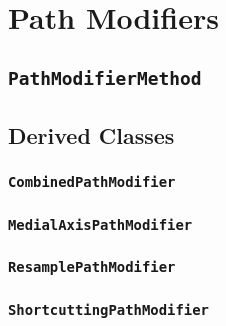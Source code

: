 \chapter{Path Modifiers}

\section{\texttt{PathModifierMethod}}

\section{Derived Classes}

\subsection{\texttt{CombinedPathModifier}}

\subsection{\texttt{MedialAxisPathModifier}}

\subsection{\texttt{ResamplePathModifier}}

\subsection{\texttt{ShortcuttingPathModifier}}
